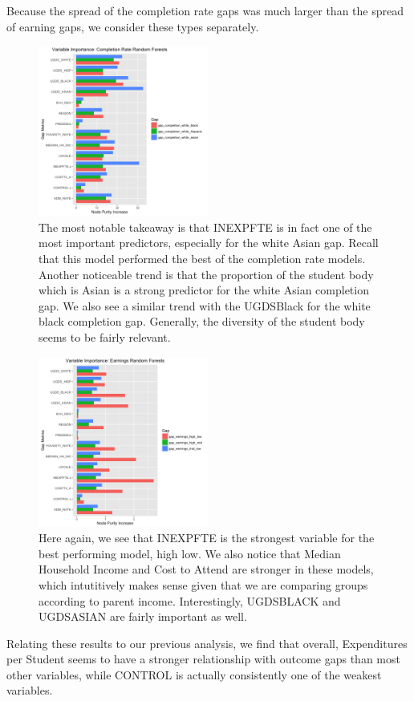 \documentclass{article}
\begin{document}
Because the spread of the completion rate gaps was much larger than the spread of earning gaps, we consider these types separately.


\begin{figure}[H]
\centering
\includegraphics[width=0.5\textwidth]{../images/rf_importance_completion.png}
\caption{\label{fig: CompletionRatesCohorts} The most notable takeaway is that INEXPFTE is in fact one of the most important predictors, especially for the white Asian gap. Recall that this model performed the best of the completion rate models. Another noticeable trend is that the proportion of the student body which is Asian is a strong predictor for the white Asian completion gap. We also see a similar trend with the UGDSBlack for the white black completion gap. Generally, the diversity of the student body seems to be fairly relevant.}
\end{figure}



\begin{figure}[H]
\centering
\includegraphics[width=0.5\textwidth]{../images/rf_importance_earnings.png}
\caption{\label{fig: EarningsRFImportance} Here again, we see that INEXPFTE is the strongest variable for the best performing model, high low. We also notice that Median Household Income and Cost to Attend are stronger in these models, which intutitively makes sense given that we are comparing groups according to parent income. Interestingly, UGDSBLACK and UGDSASIAN are fairly important as well.}
\end{figure}

Relating these results to our previous analysis, we find that overall, Expenditures per Student seems to have a stronger relationship with outcome gaps than most other variables, while CONTROL is actually consistently one of the weakest variables. 
\end{document}
